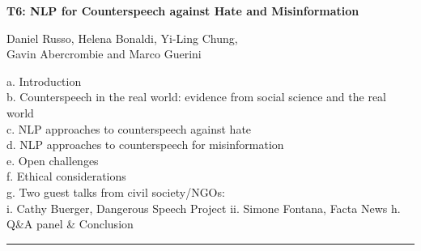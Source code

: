 \begin{center}
    \Large{\textbf{T6: NLP for Counterspeech against Hate and Misinformation}\\}
    \par\bigskip
    \large{Daniel Russo, Helena Bonaldi, Yi-Ling Chung, \\
    Gavin Abercrombie and Marco Guerini}\\
    \par\bigskip

\end{center}

a. Introduction\\
b. Counterspeech in the real world: evidence from social science and the real world\\
c. NLP approaches to counterspeech against hate\\
d. NLP approaches to counterspeech for misinformation \\
e. Open challenges \\
f. Ethical considerations \\
g. Two guest talks from civil society/NGOs:\\
    i. Cathy Buerger, Dangerous Speech Project
    ii. Simone Fontana, Facta News
h. Q&A panel \& Conclusion\\

\begin{center}
    \noindent\rule{200px}{1pt}
\end{center}
